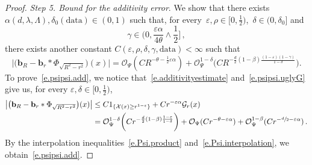 \documentclass[11pt]{article} %
\numberwithin{equation}{section}
\theoremstyle{definition}
\newcommand{\eps}{\varepsilon}
\renewcommand{\b}{\ensuremath{\mathbf{b}}}
\newcommand{\ep}{\eps}
\newcommand{\X}{\mathcal{X}}
\renewcommand{\O}{\mathcal{O}}
\newcommand{\indc}{1}
\newcommand{\data}{\mathrm{data}}
\begin{document}
\begin{proof}
\emph{Step 5. Bound for the additivity error}. We show that there exists $\alpha(d,\lambda,\Lambda),\delta_0(\data) \in (0,1)$ such that, for every~$\ep,\rho \in [0,\frac12)$,~$\delta \in (0,\delta_0]$ and
\begin{equation} \label{e.psipsi.gamma3}
\gamma 
\in 
\biggl( 0,  \frac{\ep \alpha}{4\theta} \wedge \frac12 \biggl]\,, 
\end{equation}
there exists another constant $C(\ep,\rho,\delta,\gamma,\data) < \infty$ such that
\begin{equation} \label{e.psipsi.add}
\big|
\bigl( \b_R - \b_r \ast \Phi_{\sqrt{R^2-r^2}} \bigr) (x) 
\big|
 = 
\O_\Psi(C R^{-\theta - \frac12 \ep \alpha} )  + \O_{\Psi}^{1-\delta}\biggl(C R^{- \frac{d}{2}(1-\beta)   \frac{(1-\ep)(1 - \gamma)}{1-\delta}}  \biggr) 
.
\end{equation}
To prove~\eqref{e.psipsi.add}, we notice that~\eqref{e.additivityestimate} and~\eqref{e.psipsi.uglyG} give us, for every $\ep, \delta \in [0,\frac12)$, 
\begin{align*}  
\big|
\bigl( \b_R - \b_r \ast \Phi_{\sqrt{R^2-r^2}} \bigr) (x) 
\big|
& 
\leq
C \indc_{\{ \X(x) \geq r^{1-\ep} \} } +  C r^{-\ep \alpha }\mathcal{G}_r(x)  
\\ 
&
= 
\O_{\Psi}^{1-\delta}\biggl(C r^{- \frac{d}{2}(1-\beta)  \frac{1-\ep}{1-\delta}} \biggr) 
+ 
\O_\Psi(C r^{-\theta - \ep \alpha} ) 
+ 
\O_\Psi^{1-\beta}(C r^{-\sfrac d2 - \ep \alpha} ) 
\,.
\end{align*}
By the interpolation inequalities~\eqref{e.Psi.product} and~\eqref{e.Psi.interpolation},  we obtain~\eqref{e.psipsi.add}. 


\smallskip 



\end{proof}
\end{document}

